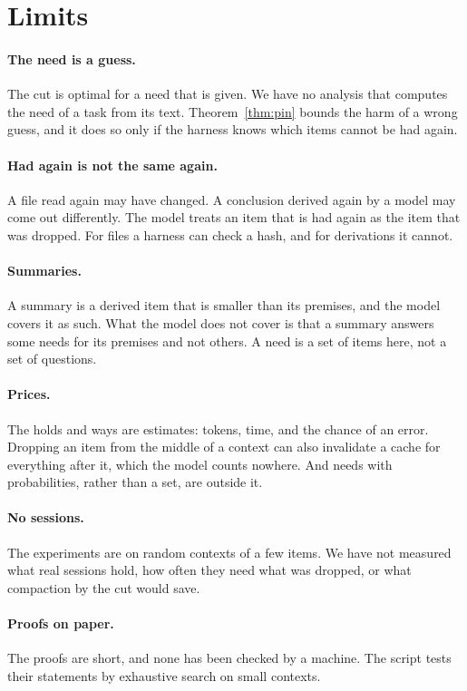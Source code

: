 \documentclass[acmsmall,nonacm,screen]{acmart}
\begin{document}
\section{Limits}\label{sec:limits}

\paragraph{The need is a guess.} The cut is optimal for a need that is given. We have no
analysis that computes the need of a task from its text. Theorem~\ref{thm:pin} bounds the
harm of a wrong guess, and it does so only if the harness knows which items cannot be had
again.

\paragraph{Had again is not the same again.} A file read again may have changed. A
conclusion derived again by a model may come out differently. The model treats an item that
is had again as the item that was dropped. For files a harness can check a hash, and for
derivations it cannot.

\paragraph{Summaries.} A summary is a derived item that is smaller than its premises, and
the model covers it as such. What the model does not cover is that a summary answers some
needs for its premises and not others. A need is a set of items here, not a set of
questions.

\paragraph{Prices.} The holds and ways are estimates: tokens, time, and the chance of an
error. Dropping an item from the middle of a context can also invalidate a cache for
everything after it, which the model counts nowhere. And needs with probabilities, rather
than a set, are outside it.

\paragraph{No sessions.} The experiments are on random contexts of a few items. We have not
measured what real sessions hold, how often they need what was dropped, or what compaction
by the cut would save.

\paragraph{Proofs on paper.} The proofs are short, and none has been checked by a machine.
The script tests their statements by exhaustive search on small contexts.
\end{document}
